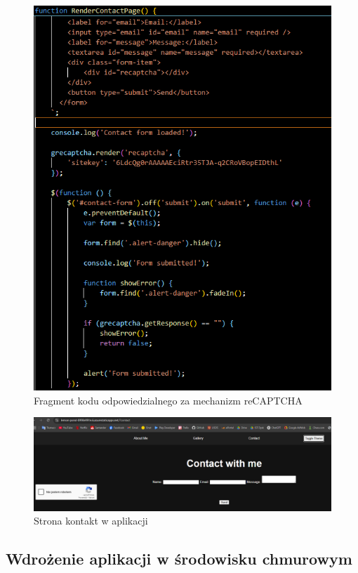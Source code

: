\documentclass[a4paper,12pt]{article}
\begin{document}
\begin{figure}[H]
    \centering
    \includegraphics[width=1\textwidth]{images/recaptcha.png}
    \caption{Fragment kodu odpowiedzialnego za mechanizm reCAPTCHA}
\end{figure}

\begin{figure}[H]
    \centering
    \includegraphics[width=1\textwidth]{images/contact.png}
    \caption{Strona kontakt w aplikacji}
\end{figure}

\subsection{Wdrożenie aplikacji w środowisku chmurowym}
\end{document}
